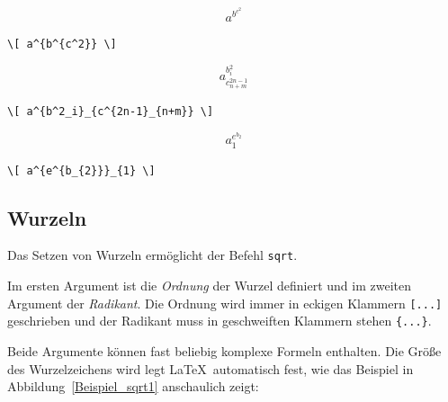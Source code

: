 \documentclass[a4paper,10pt,twoside]{scrbook}
\begin{document}
{\begin{minipage}[c]{.4\textwidth}
\vspace*{-5mm}
\[ a^{b^{c^2}} \]
\end{minipage}
\hfill
\begin{minipage}[c]{.58\textwidth}
\setlength{\parskip}{1em}
\verb!\[ a^{b^{c^2}} \]!
\end{minipage}

\begin{minipage}[c]{.4\textwidth}
\vspace*{-5mm}
\[ a^{b^2_i}_{c^{2n-1}_{n+m}} \]
\end{minipage}
\hfill
\begin{minipage}[c]{.58\textwidth}
\setlength{\parskip}{1em}
\verb!\[ a^{b^2_i}_{c^{2n-1}_{n+m}} \]!
\end{minipage}

\begin{minipage}[c]{.4\textwidth}
\vspace*{-5mm}
\[ a^{e^{b_{2}}}_{1} \]
\end{minipage}
\hfill
\begin{minipage}[c]{.58\textwidth}
\setlength{\parskip}{1em}
\verb!\[ a^{e^{b_{2}}}_{1} \]!
\end{minipage}


\subsection{Wurzeln}


Das Setzen von Wurzeln ermöglicht der Befehl
\verb!sqrt!.



Im ersten Argument ist die \textsl{Ordnung} der Wurzel definiert und im 
zweiten Argument der \textsl{Radikant}. Die Ordnung wird immer in eckigen 
Klammern \verb![...]! geschrieben und der 
Radikant muss in geschweiften Klammern stehen \verb!{...}!.



Beide Argumente können fast beliebig komplexe 
Formeln enthalten. 
Die Größe des Wurzelzeichens wird
legt \LaTeX\ automatisch fest, wie das Beispiel in Abbildung~\ref{Beispiel_sqrt1} anschaulich zeigt:


}
\end{document}
